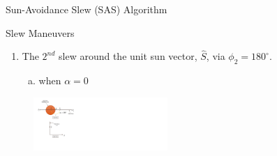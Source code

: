 \documentclass{beamer}
\begin{document}
\begin{frame}{Sun-Avoidance Slew (SAS) Algorithm}
\begin{block}{Slew Maneuvers}
\begin{enumerate}[2]
\item The $2^{nd}$ slew around the unit sun vector, $\hat{S}$, via $\phi_2=180^{\circ}$.
\begin{enumerate}[b)]
\item when $\alpha=0$
\end{enumerate}
\end{enumerate}
\begin{figure}
\includegraphics[width=2in]{./Figures/SVAS_3r_modified}
\end{figure}
\end{block}
\end{frame}
\end{document}
